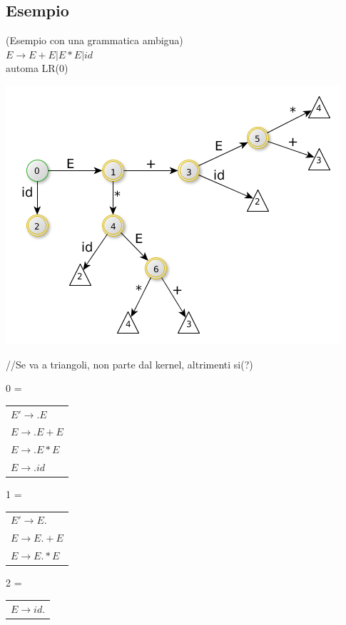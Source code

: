 \subsection{Esempio}
(Esempio con una grammatica ambigua)\\

$E \rightarrow E + E | E * E | id $\\
automa LR(0)

\begin{center}
    \includegraphics[scale=0.6]{Chapters/Img/c02_17.png}\\
\end{center} 

//Se va a triangoli, non parte dal kernel, altrimenti si(?)

0 =
\begin{tabular}{l}
	$E' \rightarrow .E$		\\
	$E \rightarrow .E + E$	\\
	$E \rightarrow .E * E$	\\
	$E \rightarrow .id$		\\
\end{tabular}

1 =
\begin{tabular}{l}
	$E' \rightarrow E.$		\\
	$E \rightarrow E. + E$	\\
	$E \rightarrow E. * E$	\\
\end{tabular}

2 =
\begin{tabular}{l}
	$E \rightarrow id.$		\\
\end{tabular}

